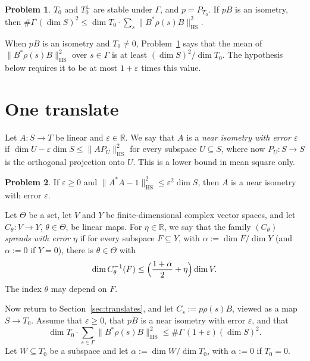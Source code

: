 \documentclass[reqno]{amsart}
\numberwithin{equation}{section}
\theoremstyle{definition}
\newtheorem{problem}{Problem}[section]
\theoremstyle{plain}
\theoremstyle{remark}
\newcommand{\R}{\mathbb{R}}
\newcommand{\HS}{\mathrm{HS}}
\begin{document}
\begin{problem}\label{pr:moment-min}
\(T_0\) and \(T_0^\perp\) are stable under \(\Gamma\), and \(p = P_{T_0}\).  If \(pB\) is an isometry, then \(\#\Gamma\,(\dim S)^2 \le \dim T_0 \cdot \sum_s \lVert B^*\rho(s)B \rVert_\HS^2\).
\end{problem}

When \(pB\) is an isometry and \(T_0\ne0\), Problem~\ref{pr:moment-min} says that the mean of \(\lVert B^*\rho(s)B \rVert_\HS^2\) over \(s \in \Gamma\) is at least \((\dim S)^2/\dim T_0\).  The hypothesis below requires it to be at most \(1+\varepsilon\) times this value.

\section{One translate}\label{sec:spread}

Let \(A \colon S \to T\) be linear and \(\varepsilon \in \R\).  We say that \(A\) is a \emph{near isometry with error \(\varepsilon\)} if \(\dim U - \varepsilon \dim S \le \lVert A P_U \rVert_\HS^2\) for every subspace \(U \subseteq S\), where now \(P_U \colon S \to S\) is the orthogonal projection onto \(U\).  This is a lower bound in mean square only.

\begin{problem}\label{pr:near-isom}
If \(\varepsilon \ge 0\) and \(\lVert A^*A - 1 \rVert_\HS^2 \le \varepsilon^2 \dim S\), then \(A\) is a near isometry with error \(\varepsilon\).
\end{problem}

Let \(\Theta\) be a set, let \(V\) and \(Y\) be finite-dimensional complex vector spaces, and let \(C_\theta \colon V \to Y\), \(\theta \in \Theta\), be linear maps.  For \(\eta \in \R\), we say that the family \((C_\theta)\) \emph{spreads with error \(\eta\)} if for every subspace \(F \subseteq Y\), with \(\alpha := \dim F/\dim Y\) (and \(\alpha := 0\) if \(Y = 0\)), there is \(\theta \in \Theta\) with
\[
  \dim C_\theta^{-1}(F) \le \Bigl( \frac{1 + \alpha}{2} + \eta \Bigr) \dim V .
\]
The index \(\theta\) may depend on \(F\).

Now return to Section~\ref{sec:translates}, and let \(C_s := p\rho(s)B\), viewed as a map \(S \to T_0\).  Assume that \(\varepsilon \ge 0\), that \(pB\) is a near isometry with error \(\varepsilon\), and that
\begin{equation}\label{eq:moment}
  \dim T_0 \cdot \sum_{s \in \Gamma} \lVert B^*\rho(s)B \rVert_\HS^2 \le \#\Gamma\,(1 + \varepsilon)(\dim S)^2 .
\end{equation}
Let \(W \subseteq T_0\) be a subspace and let \(\alpha := \dim W/\dim T_0\), with \(\alpha := 0\) if \(T_0=0\).
\end{document}
